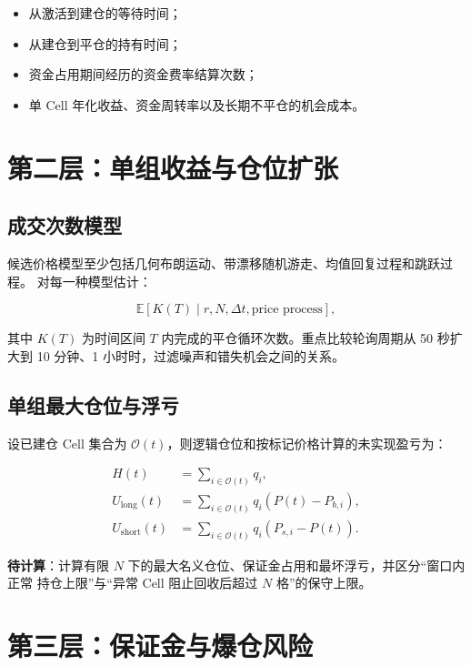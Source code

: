\documentclass[11pt,a4paper,fontset=none]{ctexart}
\newcommand{\todoitem}{\textcolor{ResearchGold}{\textbf{待计算}}}
\begin{document}
\begin{itemize}
  \item 从激活到建仓的等待时间；
  \item 从建仓到平仓的持有时间；
  \item 资金占用期间经历的资金费率结算次数；
  \item 单 Cell 年化收益、资金周转率以及长期不平仓的机会成本。
\end{itemize}

\section{第二层：单组收益与仓位扩张}

\subsection{成交次数模型}

候选价格模型至少包括几何布朗运动、带漂移随机游走、均值回复过程和跳跃过程。
对每一种模型估计：

\begin{equation}
  \mathbb{E}[K(T)\mid r,N,\Delta t,\text{price process}],
\end{equation}

其中 $K(T)$ 为时间区间 $T$ 内完成的平仓循环次数。重点比较轮询周期从 50 秒扩大到
10 分钟、1 小时时，过滤噪声和错失机会之间的关系。

\subsection{单组最大仓位与浮亏}

设已建仓 Cell 集合为 $\mathcal{O}(t)$，则逻辑仓位和按标记价格计算的未实现盈亏为：

\begin{align}
  H(t) &= \sum_{i\in\mathcal{O}(t)} q_i,\\
  U_{\mathrm{long}}(t) &= \sum_{i\in\mathcal{O}(t)}q_i(P(t)-P_{b,i}),\\
  U_{\mathrm{short}}(t) &= \sum_{i\in\mathcal{O}(t)}q_i(P_{s,i}-P(t)).
\end{align}

\todoitem：计算有限 $N$ 下的最大名义仓位、保证金占用和最坏浮亏，并区分“窗口内正常
持仓上限”与“异常 Cell 阻止回收后超过 $N$ 格”的保守上限。

\section{第三层：保证金与爆仓风险}
\end{document}
